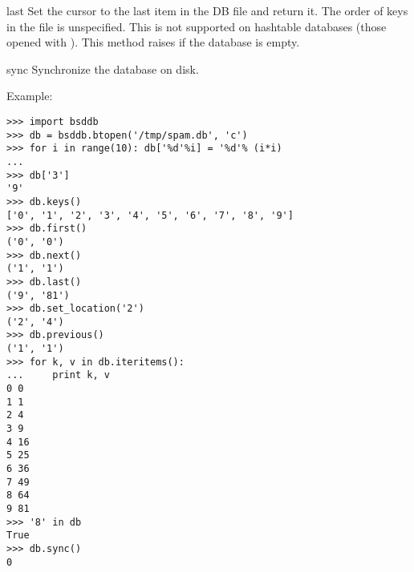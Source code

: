 \begin{methoddesc}{last}{}
Set the cursor to the last item in the DB file and return it.  The
order of keys in the file is unspecified.  This is not supported on
hashtable databases (those opened with ).
This method raises  if the database is empty.
\end{methoddesc}

\begin{methoddesc}{sync}{}
Synchronize the database on disk.
\end{methoddesc}

Example:

\begin{verbatim}
>>> import bsddb
>>> db = bsddb.btopen('/tmp/spam.db', 'c')
>>> for i in range(10): db['%d'%i] = '%d'% (i*i)
... 
>>> db['3']
'9'
>>> db.keys()
['0', '1', '2', '3', '4', '5', '6', '7', '8', '9']
>>> db.first()
('0', '0')
>>> db.next()
('1', '1')
>>> db.last()
('9', '81')
>>> db.set_location('2')
('2', '4')
>>> db.previous() 
('1', '1')
>>> for k, v in db.iteritems():
...     print k, v
0 0
1 1
2 4
3 9
4 16
5 25
6 36
7 49
8 64
9 81
>>> '8' in db
True
>>> db.sync()
0
\end{verbatim}
